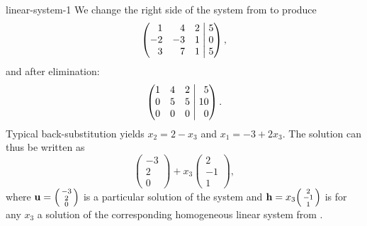 \begin{example}{}{linear-system-1}
 We change the right side of the system from
  to produce
 \[
  \left(
   \begin{matrix*}[r]
    1 & 4 & 2\\
    -2 & -3 & 1\\
    3 & 7 & 1
   \end{matrix*}
   \hspace{1mm}
  \right|
  \left.
   \begin{matrix*}[r]
    5\\
    0\\
    5
   \end{matrix*}
  \right),
 \]
 and after elimination:
 \[
  \left(
   \begin{matrix*}[r]
    1 & 4 & 2\\
    0 & 5 & 5\\
    0 & 0 & 0
   \end{matrix*}
   \hspace{1mm}
  \right|
  \left.
   \begin{matrix*}[r]
    5\\
    10\\
    0
   \end{matrix*}
  \right).
 \]
 Typical back-substitution yields $x_2 = 2 - x_3$ and $x_1 = -3 + 2x_3$. The
 solution can thus be written as
 \[
  \begin{pmatrix}
   -3\\
   2\\
   0
  \end{pmatrix} + x_3
  \begin{pmatrix}
   2\\
   -1\\
   1
  \end{pmatrix},
 \]
 where $\mathbf{u} = \begin{psmallmatrix} -3 \\ 2 \\ 0 \end{psmallmatrix}$ is a
 particular solution of the system and $\mathbf{h} = x_3\begin{psmallmatrix} 2
 \\ -1 \\ 1 \end{psmallmatrix}$ is for any $x_3$ a solution of the corresponding
 homogeneous linear system from .
\end{example}

